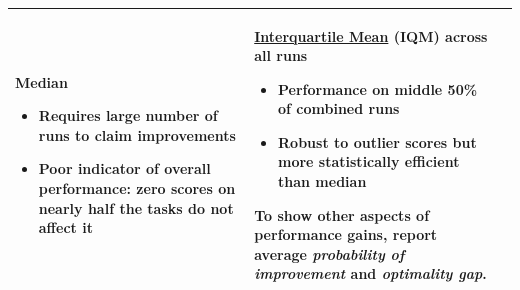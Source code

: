 \begin{table}[t]
{\begin{tabular}{@{}m{}m{}m{}@{}}
\begin{itemize}[left=0.6em, itemsep=0.01em]
    \end{itemize} 
    \textbf{Median} \begin{itemize}[left=0.6em, itemsep=0.01em]
        \item Requires large number of runs to claim improvements
        \item Poor indicator of overall performance: zero scores on nearly half the tasks do not affect it
    \end{itemize} & 
    \hyperref[sec:aggregate_metrics_robust]{\textbf{Interquartile Mean}} (IQM) across all runs \begin{itemize}[left=0.6em, itemsep=0.01em]
        \item Performance on middle 50\% of combined runs
        \item Robust to outlier scores but more statistically efficient than median
    \end{itemize}
    To show other aspects of performance gains, report average \emph{probability of improvement} and \emph{optimality gap}. \\[-0.2cm]
    \bottomrule
  \end{tabular}}
  \vspace{-0.3cm}
\end{table}